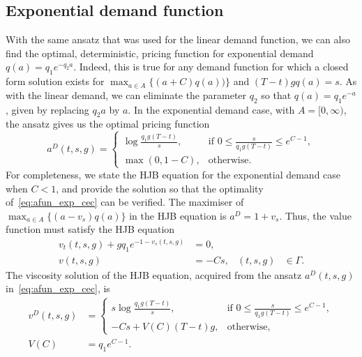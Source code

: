 \documentclass[main.tex]{subfiles}
\begin{document}
\subsection{Exponential demand function}
With the same ansatz that was used for the linear demand function, we
can also find the optimal, deterministic, pricing function for
exponential demand $q(a)=q_1e^{-q_2a}$.
Indeed, this is true for any demand function for which a closed form
solution exists for $\max_{a\in A}\{(a+C)q(a))\}$ and $(T-t)gq(a)=s$.
As with the linear demand, we can eliminate the parameter $q_2$ so that
$q(a)=q_1e^{-a}$, given by replacing $q_2a$ by $a$.
In the exponential demand case, with $A=[0,\infty)$, the ansatz gives
us the optimal pricing function
\begin{equation}\label{eq:afun_exp_cec}
  a^D(t,s,g)=\begin{cases}
    \log{\frac{q_1g(T-t)}{s}},
    &\text{if } 0\leq\frac{s}{q_1g(T-t)}\leq e^{C-1},\\
    \max\left(0,1-C\right),&\text{otherwise}.
  \end{cases}
\end{equation}
For completeness, we state the HJB equation for the exponential demand
case when $C<1$, and provide the solution so that the optimality of~\eqref{eq:afun_exp_cec} can
be verified. The maximiser of $\max_{a\in A}\{(a-v_s)q(a)\}$ in the
HJB equation is $a^D =  1+v_s$. Thus, the value function
must satisfy the HJB equation
\begin{align}
  v_t(t,s,g)
  +gq_1e^{-1-v_s(t,s,g)}
  &=0, \\%
  v(t,s,g) &= -Cs,&(t,s,g)&\in \Gamma.
\end{align}
The viscosity solution of the HJB equation, acquired from the ansatz $a^D(t,s,g)$
in~\eqref{eq:afun_exp_cec}, is
\begin{align}
  v^D(t,s,g)
  &=\begin{cases}
    s \log \frac{q_1g(T-t)}{s},
    &\text{if } 0\leq \frac{s}{q_1g(T-t)}\leq e^{C-1},\\
    -Cs+V(C)(T-t)g,&\text{otherwise},
  \end{cases}\\
  V(C)&=q_1e^{C-1}.
\end{align}
\end{document}
